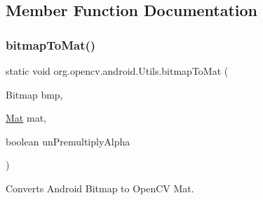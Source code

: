 \subsection{Member Function Documentation}
\mbox{\label{classorg_1_1opencv_1_1android_1_1_utils_a6f6725aea74948d60a7f6e7dddfabf13}} 
\subsubsection{\texorpdfstring{bitmap\+To\+Mat()}{bitmapToMat()}\hspace{0.1cm}{\footnotesize\ttfamily [1/2]}}
{\footnotesize\ttfamily static void org.\+opencv.\+android.\+Utils.\+bitmap\+To\+Mat (\begin{DoxyParamCaption}\item[{Bitmap}]{bmp,  }\item[{\mbox{\hyperlink{classorg_1_1opencv_1_1core_1_1_mat}{Mat}}}]{mat,  }\item[{boolean}]{un\+Premultiply\+Alpha }\end{DoxyParamCaption})\hspace{0.3cm}{\ttfamily [static]}}

Converts Android Bitmap to Open\+CV Mat. 

